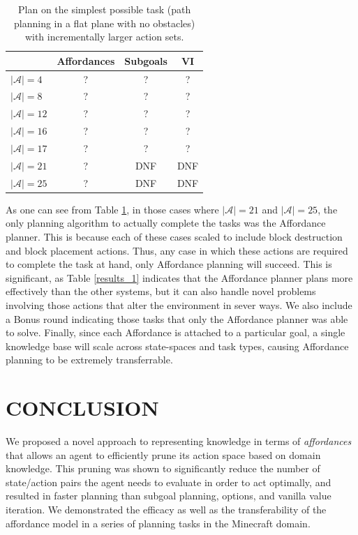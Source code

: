 \documentclass[]{article}
\begin{document}
\vspace{4 mm}

\begin{table}
\begin{tabular}{ l || c | c | c }
  & Affordances & Subgoals & VI \\
  \hline
  $|\mathcal{A}| = 4$ 		& 	? 	& 	? 		& ?  \\
  $|\mathcal{A}| = 8$ 		& 	? 	& 	? 		& ?  \\
  $|\mathcal{A}| = 12$ 	& 	? 	& 	? 		& ?  \\
  $|\mathcal{A}| = 16$ 	& 	? 	& 	? 		& ?  \\
  $|\mathcal{A}| = 17$ 	& 	? 	& 	? 		& ?  \\
  $|\mathcal{A}| = 21$ 	& 	? 	& 	DNF 		& DNF  \\
  $|\mathcal{A}| = 25$ 	& 	? 	& 	DNF 		& DNF  \\
\end{tabular}
\label{results_2}
\caption{Plan on the simplest possible task (path planning in a flat plane with no obstacles) with incrementally larger action sets.}
\end{table}

As one can see from Table \ref{results_2}, in those cases where
$|\mathcal{A}| = 21$ and $|\mathcal{A}| = 25$, the only planning algorithm to
actually complete the tasks was the Affordance planner. This is because each
of these cases scaled to include block destruction and block placement actions.
Thus, any case in which these actions are required to complete the task at hand,
only Affordance planning will succeed. This is significant, as Table \ref{results_1}
indicates that the Affordance planner plans more effectively than the other
systems, but it can also handle novel problems involving those actions that
alter the environment in sever ways. We also include a Bonus round indicating
those tasks that only the Affordance planner was able to solve. Finally, since
each Affordance is attached to a particular goal, a single knowledge base will
scale across state-spaces and task types, causing Affordance planning to be
extremely transferrable.


\section{CONCLUSION}

We proposed a novel approach to representing knowledge in terms of
{\em affordances}~\citep{gibson77} that allows an agent to efficiently
prune its action space based on domain knowledge. This pruning was
shown to significantly reduce the number of state/action pairs the
agent needs to evaluate in order to act optimally, and resulted in
faster planning than subgoal planning, options, and vanilla value
iteration. We demonstrated the efficacy as well as the transferability
of the affordance model in a series of planning tasks in the Minecraft
domain.
\end{document}
